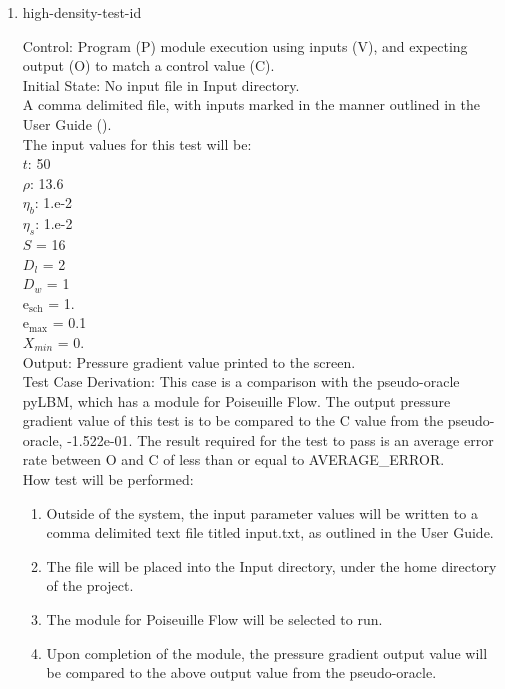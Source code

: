 \documentclass[12pt, titlepage]{article}
\newcounter{testcounter} %
\begin{document}
\begin{enumerate}
\item{high-density-test-id\thetestcounter \\}

Control: Program (P) module execution using inputs (V), and expecting output (O) to match a control value (C).\\
					
Initial State: No input file in Input directory.\\
					
A comma delimited file, with inputs marked in the manner outlined in the User Guide (\citet{LBM_UserGuide_PM}).\\The input values for this test will be:\\
$t$: 50\\
$\rho$: 13.6\\
$\eta_b$: 1.e-2\\
$\eta_s$: 1.e-2\\
$S$ = 16\\
$D_{l}$ = 2\\
$D_{w}$ = 1\\
$\mathrm{e_{sch}}$ = 1.\\
$\mathrm{e_{max}}$ = 0.1\\
$X_{min}$ = 0.\\

					
Output: Pressure gradient value printed to the screen.  \\

Test Case Derivation: This case is a comparison with the pseudo-oracle pyLBM, which has a module for Poiseuille Flow. The output pressure gradient value of this test is to be compared to the C value from the pseudo-oracle, -1.522e-01. The result required for the test to pass is an average error rate between O and C of less than or equal to AVERAGE\_ERROR.\\

					
How test will be performed: 

\begin{enumerate}
\item Outside of the system, the input parameter values will be written to a comma delimited text file titled input.txt, as outlined in the User Guide.
\item The file will be placed into the Input directory, under the home directory of the project.
\item The module for Poiseuille Flow will be selected to run.
\item Upon completion of the module, the pressure gradient output value will be compared to the above output value from the pseudo-oracle.
\end{enumerate}	


\end{enumerate}
\end{document}
